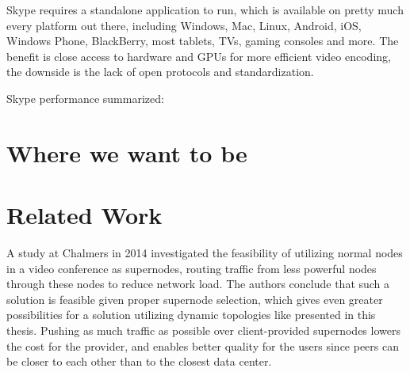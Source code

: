Skype requires a standalone application to run, which is available on pretty much every platform out there, including Windows, Mac, Linux, Android, iOS, Windows Phone, BlackBerry, most tablets, TVs, gaming consoles and more. The benefit is close access to hardware and GPUs for more efficient video encoding, the downside is the lack of open protocols and standardization.

Skype performance summarized:






\section{Where we want to be}



\section{Related Work}


A study at Chalmers in 2014\cite{tree-topology-webrtc} investigated the feasibility of utilizing normal nodes in a video conference as supernodes, routing traffic from less powerful nodes through these nodes to reduce network load. The authors conclude that such a solution is feasible given proper supernode selection, which gives even greater possibilities for a solution utilizing dynamic topologies like presented in this thesis. Pushing as much traffic as possible over client-provided supernodes lowers the cost for the provider, and enables better quality for the users since peers can be closer to each other than to the closest data center.
